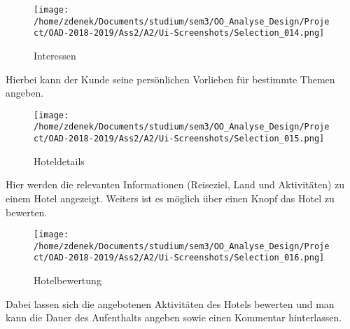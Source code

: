 \documentclass[a4paper]{article}
\begin{document}
\begin{figure}[h]
\centering
\caption{Interessen}
\texttt{[image: /home/zdenek/Documents/studium/sem3/OO\_Analyse\_Design/Project/OAD-2018-2019/Ass2/A2/Ui-Screenshots/Selection\_014.png]}
\end{figure}

Hierbei kann der Kunde seine persönlichen Vorlieben für bestimmte Themen angeben.

\begin{figure}[h]
\centering
\caption{Hoteldetails}
\texttt{[image: /home/zdenek/Documents/studium/sem3/OO\_Analyse\_Design/Project/OAD-2018-2019/Ass2/A2/Ui-Screenshots/Selection\_015.png]}
\end{figure}

Hier werden die relevanten Informationen (Reiseziel, Land und Aktivitäten) zu einem Hotel angezeigt. Weiters ist es möglich über einen Knopf das Hotel zu bewerten.

\begin{figure}[h]
\centering
\caption{Hotelbewertung}
\texttt{[image: /home/zdenek/Documents/studium/sem3/OO\_Analyse\_Design/Project/OAD-2018-2019/Ass2/A2/Ui-Screenshots/Selection\_016.png]}
\end{figure}

Dabei lassen sich die angebotenen Aktivitäten des Hotels bewerten und man kann die Dauer des Aufenthalts angeben sowie einen Kommentar hinterlassen.
\end{document}
